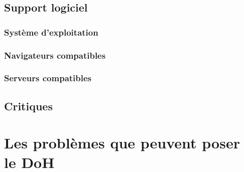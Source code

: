 \documentclass[a4paper,12pt]{article}
\begin{document}
	\subsection{Support logiciel}
	
	\subsubsection{Système d'exploitation}
	
	\subsubsection{Navigateurs compatibles}
	
	\subsubsection{Serveurs compatibles}
	
	\subsection{Critiques}
	
	\section{Les problèmes que peuvent poser le DoH}
	
	
	
\end{document}

